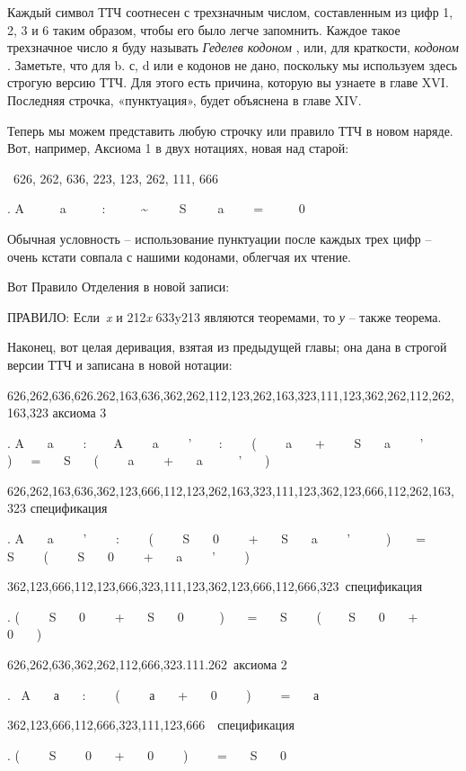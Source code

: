 \documentclass[../main.tex]{subfiles}
\begin{document}
Каждый символ ТТЧ соотнесен с трехзначным числом, составленным из цифр 1, 2, 3 и 6 таким образом, чтобы его было легче запомнить. Каждое такое трехзначное число я буду называть \emph{Геделев кодоном} , или, для краткости, \emph{кодоном} . Заметьте, что для b. с, d или е кодонов не дано, поскольку мы используем здесь строгую версию ТТЧ\@. Для этого есть причина, которую вы узнаете в главе XVI\@. Последняя строчка, «пунктуация», будет объяснена в главе XIV.

Теперь мы можем представить любую строчку или правило ТТЧ в новом наряде. Вот, например, Аксиома 1 в двух нотациях, новая над старой:

~626, 262, 636, 223, 123, 262, 111, 666

. A~~~~~ a~~~~ ~:~~~~~ \textasciitilde~~~~~S~~~~~a~~~~ =~~~~~ 0

Обычная условность \--- использование пунктуации после каждых трех цифр \--- очень кстати совпала с нашими кодонами, облегчая их чтение.

Вот Правило Отделения в новой записи:

ПРАВИЛО: Если~\emph{x} и 212\emph{x} 633y213 являются теоремами, то \emph{у} \--- также теорема.

Наконец, вот целая деривация, взятая из предыдущей главы; она дана в строгой версии ТТЧ и записана в новой нотации:

626,262,636,626.262,163,636,362,262,112,123,262,163,323,111,123,362,262,112,262,163,323 аксиома 3

. A~~~ a~~~~ :~ ~~ A~~~ ~a~~~~ '~~ ~ :~~~~ (~~~ ~a~~~ +~~~~ S~~~ a~~~~ '~~~~ )~~~=~~~ S~~~ (~~~~ a~~~~ +~~~ a~~~~~ '~~~ )

626,262,163,636,362,123,666,112,123,262,163,323,111,123,362,123,666,112,262,163,323 спецификация

. A~~~ a~~~~ '~~~~ :~~~~ (~~~~ S~~ ~0~~~~ +~~~ S~~~ a~~~~ '~~~~~ )~~~~=~~~ S~~~~ (~~~~ S~~~ 0~~~~ +~~~ a~~~~ '~~~~ )

362,123,666,112,123,666,323,111,123,362,123,666,112,666,323~спецификация

. (~~~~ S~~~ 0~~~~ +~~~ S~~~ 0~~~~~ )~~~ =~~~ S~~~~ ( ~~~ S~~~ 0~~~ +~~~~ 0~~~ )

626,262,636,362,262,112,666,323.111.262~аксиома 2

.~ A~~~ а~~ ~:~~~~ (~~~~ а~~~ +~~~ 0~~~ ~)~~~~ =~~~ а

362,123,666,112,666,323,111,123,666~~спецификация

. (~~~~ S~~~~ 0~~~ +~~ ~0~~~~ )~~~~ =~~~ S~~~ 0
\end{document}
